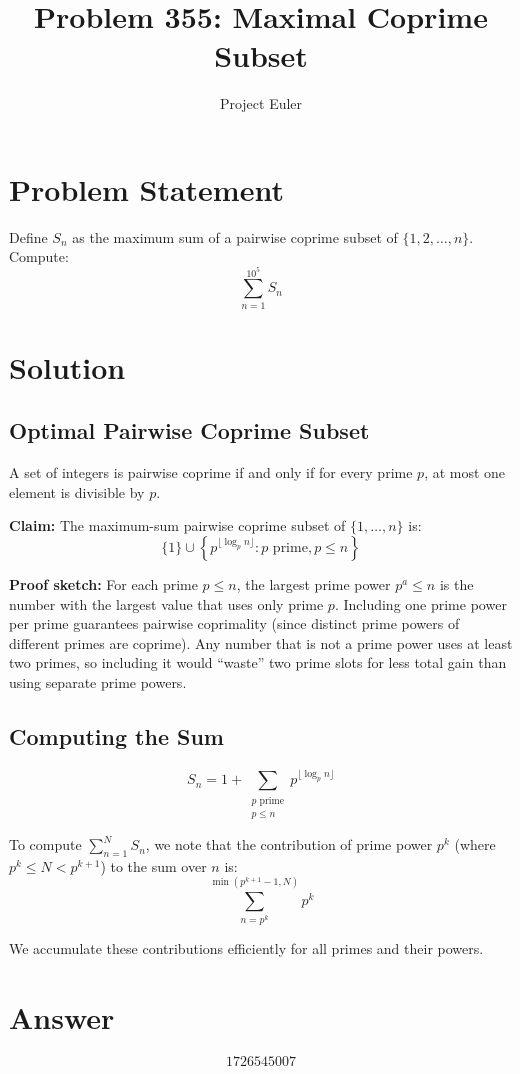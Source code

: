 \documentclass[a4paper,12pt]{article}
\title{Problem 355: Maximal Coprime Subset}
\author{Project Euler}
\date{}
\begin{document}
\maketitle

\section{Problem Statement}
Define $S_n$ as the maximum sum of a pairwise coprime subset of $\{1, 2, \ldots, n\}$. Compute:
\[
\sum_{n=1}^{10^5} S_n
\]

\section{Solution}

\subsection{Optimal Pairwise Coprime Subset}
A set of integers is pairwise coprime if and only if for every prime $p$, at most one element is divisible by $p$.

\textbf{Claim:} The maximum-sum pairwise coprime subset of $\{1, \ldots, n\}$ is:
\[
\{1\} \cup \left\{ p^{\lfloor \log_p n \rfloor} : p \text{ prime}, p \le n \right\}
\]

\textbf{Proof sketch:} For each prime $p \le n$, the largest prime power $p^a \le n$ is the number with the largest value that uses only prime $p$. Including one prime power per prime guarantees pairwise coprimality (since distinct prime powers of different primes are coprime). Any number that is not a prime power uses at least two primes, so including it would ``waste'' two prime slots for less total gain than using separate prime powers.

\subsection{Computing the Sum}
\[
S_n = 1 + \sum_{\substack{p \text{ prime} \\ p \le n}} p^{\lfloor \log_p n \rfloor}
\]

To compute $\sum_{n=1}^{N} S_n$, we note that the contribution of prime power $p^k$ (where $p^k \le N < p^{k+1}$) to the sum over $n$ is:
\[
\sum_{n=p^k}^{\min(p^{k+1}-1, N)} p^k
\]

We accumulate these contributions efficiently for all primes and their powers.

\section{Answer}

\[
\boxed{1726545007}
\]
\end{document}
